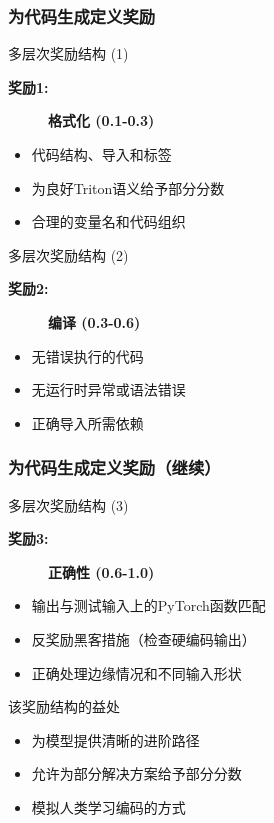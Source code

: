 \documentclass[aspectratio=169]{beamer}
\begin{document}
\begin{frame}
	\frametitle{为代码生成定义奖励}
	\begin{block}{多层次奖励结构 (1)}
		\begin{description}
			\item[\textbf{奖励1:}] \textbf{格式化 (0.1-0.3)}
		\end{description}
		\begin{itemize}
			\item 代码结构、导入和标签
			\item 为良好Triton语义给予部分分数
			\item 合理的变量名和代码组织
		\end{itemize}
	\end{block}
	\begin{block}{多层次奖励结构 (2)}
		\begin{description}
			\item[\textbf{奖励2:}] \textbf{编译 (0.3-0.6)}
		\end{description}
		\begin{itemize}
			\item 无错误执行的代码
			\item 无运行时异常或语法错误
			\item 正确导入所需依赖
		\end{itemize}
	\end{block}
\end{frame}

\begin{frame}
	\frametitle{为代码生成定义奖励（继续）}
	\begin{block}{多层次奖励结构 (3)}
		\begin{description}
			\item[\textbf{奖励3:}] \textbf{正确性 (0.6-1.0)}
		\end{description}
	\end{block}
	\begin{itemize}
		\item 输出与测试输入上的PyTorch函数匹配
		\item 反奖励黑客措施（检查硬编码输出）
		\item 正确处理边缘情况和不同输入形状
	\end{itemize}
	\vspace{0.5em}
	\begin{block}{该奖励结构的益处}
		\begin{itemize}
			\item 为模型提供清晰的进阶路径
			\item 允许为部分解决方案给予部分分数
			\item 模拟人类学习编码的方式
		\end{itemize}
	\end{block}
\end{frame}
\end{document}
